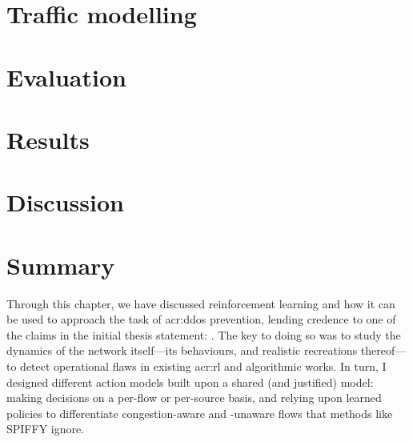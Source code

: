 \section{Traffic modelling}\label{sec:a-new-normal}


\section{Evaluation}\label{sec:ddos-evaluation}


\section{Results}\label{sec:the-results-of-doing-so}


\section{Discussion}\label{sec:ddos-discussion}


%

\section{Summary}\label{sec:ddos-summary}
Through this chapter, we have discussed reinforcement learning and how it can be used to approach the task of \gls{acr:ddos} prevention, lending credence to one of the claims in the initial thesis statement: .
The key to doing so was to study the dynamics of the network itself---its behaviours, and realistic recreations thereof---to detect operational flaws in existing \gls{acr:rl} and algorithmic works.
In turn, I designed different action models built upon a shared (and justified) model: making decisions on a per-flow or per-source basis, and relying upon learned policies to differentiate congestion-aware and -unaware flows that methods like SPIFFY ignore.

